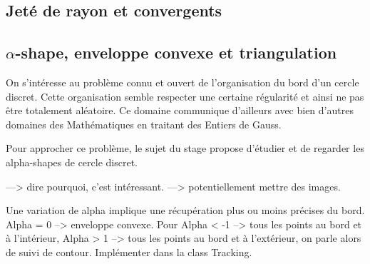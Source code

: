 \subsection{Jeté de rayon et convergents}
\label{pt1-ch1-sec:2.5}

\subsection{$\alpha$-shape, enveloppe convexe et triangulation}
\label{pt1-ch1-sec:2.6}


On s'intéresse au problème connu et ouvert de l'organisation du bord d'un cercle discret. Cette organisation semble respecter une certaine régularité et ainsi ne pas être totalement aléatoire. Ce domaine communique d'ailleurs avec bien d'autres domaines des Mathématiques en traitant des Entiers de Gauss. \newline

Pour approcher ce problème, le sujet du stage propose d'étudier et de regarder les alpha-shapes de cercle discret. \newline

---> dire pourquoi, c'est intéressant.  \newline
---> potentiellement mettre des images. \newline

Une variation de alpha implique une récupération plus ou moins précises du bord. Alpha = 0 --> enveloppe convexe. Pour Alpha < -1 --> tous les points au bord et à l'intérieur, Alpha > 1 -->  tous les points au bord et à l'extérieur, on parle alors de suivi de contour. Implémenter dans la class Tracking. \newline




 
